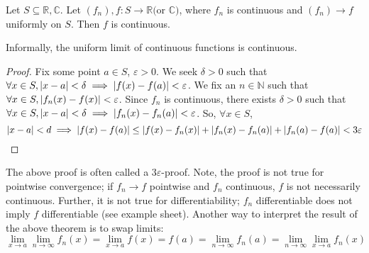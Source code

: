 \begin{theorem}
	Let \( S \subseteq \mathbb R, \mathbb C \).
	Let \( (f_n), f \colon S \to \mathbb R \text{(or } \mathbb{C} \text{)} \), where \( f_n \) is continuous and \( (f_n) \to f \) uniformly on \( S \).
	Then \( f \) is continuous.
\end{theorem}
\noindent Informally, the uniform limit of continuous functions is continuous.
\begin{proof}
	Fix some point \( a \in S \), \( \varepsilon > 0 \).
	We seek \( \delta > 0 \) such that \( \forall x \in S, \abs{x - a} < \delta \implies \abs{f(x) - f(a)} < \varepsilon \).
	We fix an \( n \in \mathbb N \) such that \( \forall x \in S, \abs{f_n(x) - f(x)} < \varepsilon \).
	Since \( f_n \) is continuous, there exists \( \delta > 0 \) such that \( \forall x \in S, \abs{x - a} < \delta \implies \abs{f_n(x) - f_n(a)} < \varepsilon \).
	So, \( \forall x \in S \),
	\[
		\abs{x - a} < d  \implies \abs{f(x) - f(a)} \leq \abs{f(x) - f_n(x)} + \abs{f_n(x) - f_n(a)} + \abs{f_n(a) - f(a)} < 3\varepsilon
	\]
\end{proof}
\begin{remark}
	The above proof is often called a \( 3\varepsilon \)-proof.
	Note, the proof is not true for pointwise convergence; if \( f_n \to f \) pointwise and \( f_n \) continuous, \( f \) is not necessarily continuous.
	Further, it is not true for differentiability; \( f_n \) differentiable does not imply \( f \) differentiable (see example sheet).
	Another way to interpret the result of the above theorem is to swap limits:
	\[
		\lim_{x \to a} \lim_{n \to \infty} f_n(x) = \lim_{x \to a} f(x) = f(a) = \lim_{n \to \infty} f_n(a) = \lim_{n \to \infty} \lim_{x \to a} f_n(x)
	\]
\end{remark}
